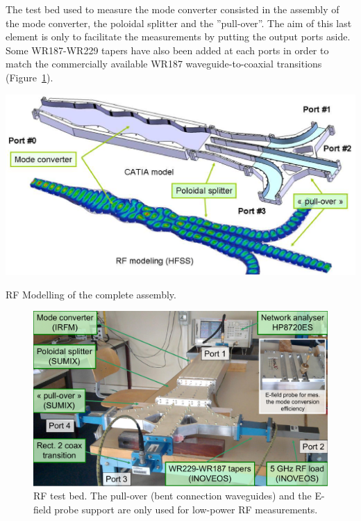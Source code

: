 The test bed used to measure the mode converter consisted in the assembly of the mode converter, the poloidal splitter and the ''pull-over''. The aim of this last element is only to facilitate the measurements by putting the output ports aside. Some WR187-WR229 tapers have also been added at each ports in order to match the commercially available WR187 waveguide-to-coaxial transitions (Figure~\ref{fig:RFTestBed}).

\begin{marginfigure}
	\includegraphics[width=1.0\linewidth]{figures/chap3/ITER_modeconverter/LH4ITER_ModeConverterMockUpCAD}
	\caption{RF Modelling of the complete assembly.}
	\label{fig:lh4itermodeconvertermockupcad}
\end{marginfigure}


\begin{figure}[h]
	\includegraphics[width=1.0\textwidth]{figures/chap3/ITER_modeconverter/Test_RFTestBed}
	\caption{RF test bed. The pull-over (bent connection waveguides) and the E-field probe support are only used for low-power RF measurements.}
	\label{fig:RFTestBed}
\end{figure}

